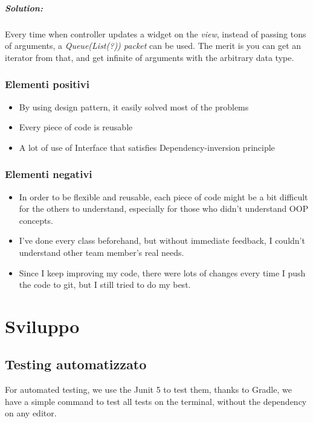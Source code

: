 \documentclass[a4paper,12pt]{report}
\begin{document}
	\paragraph*{Solution:} Every time when controller updates a widget on the \textit{\textit{view}}, instead of passing tons of arguments, a \textit{Queue(List(?)) packet} can be used. The merit is you can get an iterator from that, and get infinite of arguments with the arbitrary data type. 

	\subsection*{Elementi positivi}

	\begin{itemize}
		\item  By using design pattern, it easily solved most of the problems
		\item Every piece of code is reusable 
		\item A lot of use of Interface that satisfies Dependency-inversion principle
	\end{itemize}
	
	\subsection*{Elementi negativi}
	\begin{itemize}
		\item In order to be flexible and reusable, each piece of code might be a bit difficult for the others to understand, especially for those who didn't understand OOP concepts.
		\item I've done every class beforehand, but without immediate feedback, I couldn't understand other team member's real needs. 
		\item Since I keep improving my code, there were lots of changes every time I push the code to git, but I still tried to do my best.
	\end{itemize}

\chapter{Sviluppo}
\section{Testing automatizzato}
For automated testing, we use the Junit 5 to test them, thanks to Gradle, we have a simple command to test all tests on the terminal, without the dependency on any editor. 
\end{document}
